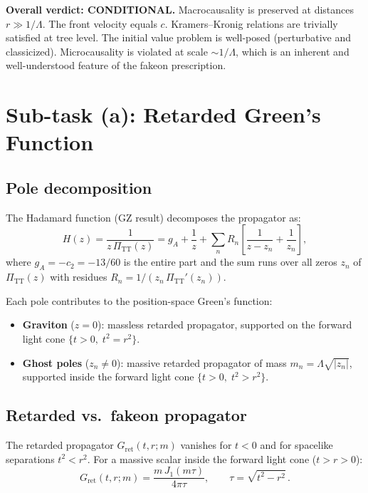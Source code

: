 \documentclass[11pt,a4paper]{article}
\newcommand{\PiTT}{\Pi_{\mathrm{TT}}}
\newcommand{\Lam}{\Lambda}
\begin{document}
\medskip\noindent
\textbf{Overall verdict: CONDITIONAL.} Macrocausality is preserved at distances
$r \gg 1/\Lam$. The front velocity equals $c$. Kramers--Kronig relations are
trivially satisfied at tree level. The initial value problem is well-posed
(perturbative and classicized). Microcausality is violated at scale $\sim 1/\Lam$,
which is an inherent and well-understood feature of the fakeon prescription.

\section{Sub-task (a): Retarded Green's Function}
\label{sec:retarded}

\subsection{Pole decomposition}

The Hadamard function (GZ result) decomposes the propagator as:
\begin{equation}\label{eq:pole-decomp}
  H(z) = \frac{1}{z\,\PiTT(z)}
  = g_A + \frac{1}{z} + \sum_n R_n\left[\frac{1}{z - z_n} + \frac{1}{z_n}\right],
\end{equation}
where $g_A = -c_2 = -13/60$ is the entire part and the sum runs over all zeros
$z_n$ of $\PiTT(z)$ with residues $R_n = 1/(z_n\,\PiTT'(z_n))$.

Each pole contributes to the position-space Green's function:
\begin{itemize}[nosep]
  \item \textbf{Graviton} ($z=0$): massless retarded propagator, supported on
    the forward light cone $\{t > 0,\; t^2 = r^2\}$.
  \item \textbf{Ghost poles} ($z_n \neq 0$): massive retarded propagator of mass
    $m_n = \Lam\sqrt{|z_n|}$, supported inside the forward light cone
    $\{t > 0,\; t^2 > r^2\}$.
\end{itemize}

\subsection{Retarded vs.\ fakeon propagator}

The retarded propagator $G_{\mathrm{ret}}(t,r;m)$ vanishes for $t < 0$ and for
spacelike separations $t^2 < r^2$. For a massive scalar inside the forward
light cone ($t > r > 0$):
\begin{equation}\label{eq:Gret-massive}
  G_{\mathrm{ret}}(t,r;m) = \frac{m\,J_1(m\tau)}{4\pi\tau},
  \qquad \tau = \sqrt{t^2 - r^2}\,.
\end{equation}
\end{document}
